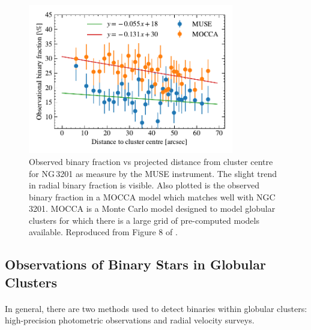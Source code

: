 \begin{figure}
	\centering
	\includegraphics[width=0.8\textwidth]{figures/radial_binarity.pdf}
	\caption{Observed binary fraction vs projected distance from cluster centre for NG\,3201 as
		measure by the MUSE instrument. The slight trend in radial binary fraction is
		visible. Also plotted is the observed binary fraction in a MOCCA model which matches
		well with NGC\,3201. MOCCA is a Monte Carlo model designed to model globular
		clusters for which there is a large grid of pre-computed models available.
		Reproduced from Figure 8 of \citet{Giesers2019}.}
	\label{fig:1/radial_binary_fraction}
\end{figure}

\subsection{Observations of Binary Stars in Globular Clusters}

\paragraph{}
In general, there are two methods used to detect binaries within globular clusters: high-precision
photometric observations and radial velocity surveys.

